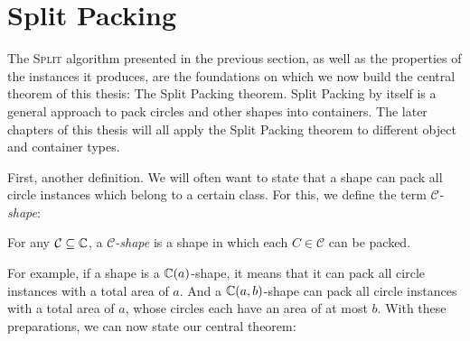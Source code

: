 \documentclass[a4paper,style=print,bibliography=totoc,nexus,lnum,extramargin]{tubsbook}
\begin{document}

\section{Split Packing}

The \textsc{Split} algorithm presented in the previous section, as well as the properties of the instances it produces, are the foundations on which we now build the central theorem of this thesis: The Split Packing theorem. Split Packing by itself is a general approach to pack circles and other shapes into containers. The later chapters of this thesis will all apply the Split Packing theorem to different object and container types.

First, another definition. We will often want to state that a shape can pack all circle instances which belong to a certain class. For this, we define the term \emph{$\mathcal{C}$-shape}:

\begin{definition}
    For any $\mathcal{C} \subseteq \mathbb{C}$, a \emph{$\mathcal{C}$-shape} is a shape in which each $C \in \mathcal{C}$ can be packed.
\end{definition}

For example, if a shape is a $\mathbb{C}(a)$-shape, it means that it can pack all circle instances with a total area of $a$. And a $\mathbb{C}(a,b)$-shape can pack all circle instances with a total area of $a$, whose circles each have an area of at most $b$.
With these preparations, we can now state our central theorem:



%

\end{document}
